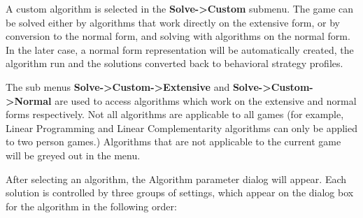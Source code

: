 \documentclass[12pt]{report}
\begin{document}
A custom algorithm is selected in the {\bf Solve->Custom} submenu.
The game can be solved either by algorithms that work directly on the
extensive form, or by conversion to the normal form, and solving with
algorithms on the normal form.  In the later case, a normal form
representation will be automatically created, the algorithm run and
the solutions converted back to behavioral strategy profiles.

The sub menus {\bf Solve->Custom->Extensive} and {\bf 
Solve->Custom->Normal} are used to access algorithms which work on the
extensive and normal forms respectively.  Not all algorithms are
applicable to all games (for example, Linear Programming and Linear
Complementarity algorithms can only be applied to two person games.)
Algorithms that are not applicable to the current game will be greyed
out in the menu.

After selecting an algorithm, the Algorithm parameter dialog will
appear. Each solution is controlled by three groups of settings, which
appear on the dialog box for the algorithm in the following order:
\end{document}
